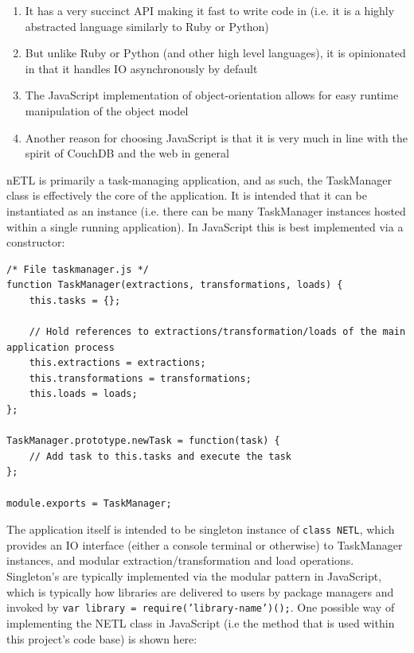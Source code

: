 \begin{enumerate}
    \item It has a very succinct API making it fast to write code in (i.e. it is a highly abstracted language similarly to Ruby or Python)
    \item But unlike Ruby or Python (and other high level languages), it is opinionated in that it handles IO asynchronously by default
    \item The JavaScript implementation of object-orientation allows for easy runtime manipulation of the object model
    \item Another reason for choosing JavaScript is that it is very much in line with the spirit of CouchDB and the web in general
\end{enumerate}

nETL is primarily a task-managing application, and as such, the TaskManager class is effectively the core of the application. It is intended that it can be instantiated as an instance (i.e. there can be many TaskManager instances hosted within a single running application). In JavaScript this is best implemented via a constructor:

\begin{verbatim}
/* File taskmanager.js */
function TaskManager(extractions, transformations, loads) {
    this.tasks = {};

    // Hold references to extractions/transformation/loads of the main application process
    this.extractions = extractions;
    this.transformations = transformations;
    this.loads = loads;
};

TaskManager.prototype.newTask = function(task) {
    // Add task to this.tasks and execute the task
};

module.exports = TaskManager;
\end{verbatim}

The application itself is intended to be singleton instance of \texttt{class NETL{}}, which provides an IO interface (either a console terminal or otherwise) to TaskManager instances, and modular extraction/transformation and load operations. Singleton's are typically implemented via the modular pattern in JavaScript, which is typically how libraries are delivered to users by package managers and invoked by \texttt{var library = require('library-name')();}. One possible way of implementing the NETL class in JavaScript (i.e the method that is used within this project's code base) is shown here:

